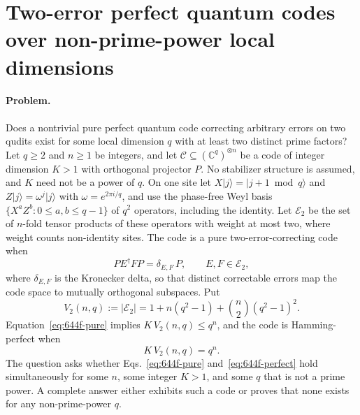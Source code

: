 \section{Two-error perfect quantum codes over non-prime-power local dimensions}
\label{sec:op_644f1aced78f36c9}

\paragraph{Problem.}
Does a nontrivial pure perfect quantum code correcting arbitrary errors on two
qudits exist for some local dimension $q$ with at least two distinct prime
factors?  Let $q\geq2$ and $n\geq1$ be integers, and let
$\mathcal C\subseteq(\mathbb C^q)^{\otimes n}$ be a code of integer dimension
$K>1$ with orthogonal projector $P$.  No stabilizer structure is assumed, and
$K$ need not be a power of $q$.  On one site let
$X\lvert j\rangle=\lvert j+1 \bmod q\rangle$ and
$Z\lvert j\rangle=\omega^j\lvert j\rangle$ with $\omega=e^{2\pi i/q}$, and use
the phase-free Weyl basis $\{X^aZ^b: 0\leq a,b\leq q-1\}$ of $q^2$ operators,
including the identity.  Let $\mathcal E_2$ be the set of $n$-fold tensor
products of these operators with weight at most two, where weight counts
non-identity sites.  The code is a pure two-error-correcting code when
\begin{equation}
  PE^\dagger FP=\delta_{E,F}\,P,
  \qquad E,F\in\mathcal E_2,
  \label{eq:644f-pure}
\end{equation}
where $\delta_{E,F}$ is the Kronecker delta, so that distinct correctable
errors map the code space to mutually orthogonal subspaces.  Put
\begin{equation}
  V_2(n,q):=\lvert\mathcal E_2\rvert
  =1+n(q^2-1)+\binom n2(q^2-1)^2 .
  \label{eq:644f-volume}
\end{equation}
Equation~\eqref{eq:644f-pure} implies $K\,V_2(n,q)\leq q^n$, and the code is
Hamming-perfect when
\begin{equation}
  K\,V_2(n,q)=q^n .
  \label{eq:644f-perfect}
\end{equation}
The question asks whether Eqs.~\eqref{eq:644f-pure} and~\eqref{eq:644f-perfect}
hold simultaneously for some $n$, some integer $K>1$, and some $q$ that is not
a prime power.  A complete answer either exhibits such a code or proves that
none exists for any non-prime-power $q$.

